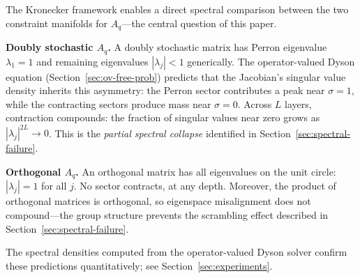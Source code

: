The Kronecker framework enables a direct spectral comparison between the two constraint manifolds for $A_q$---the central question of this paper.

\medskip
\noindent\textbf{Doubly stochastic $A_q$.}
A doubly stochastic matrix has Perron eigenvalue $\lambda_1 = 1$ and remaining eigenvalues $|\lambda_j| < 1$ generically. The operator-valued Dyson equation (Section~\ref{sec:ov-free-prob}) predicts that the Jacobian's singular value density inherits this asymmetry: the Perron sector contributes a peak near $\sigma = 1$, while the contracting sectors produce mass near $\sigma = 0$. Across $L$ layers, contraction compounds: the fraction of singular values near zero grows as $|\lambda_j|^{2L} \to 0$. This is the \emph{partial spectral collapse} identified in Section~\ref{sec:spectral-failure}.

\medskip
\noindent\textbf{Orthogonal $A_q$.}
An orthogonal matrix has all eigenvalues on the unit circle: $|\lambda_j| = 1$ for all $j$. No sector contracts, at any depth. Moreover, the product of orthogonal matrices is orthogonal, so eigenspace misalignment does not compound---the group structure prevents the scrambling effect described in Section~\ref{sec:spectral-failure}.

\medskip
The spectral densities computed from the operator-valued Dyson solver confirm these predictions quantitatively; see Section~\ref{sec:experiments}.
